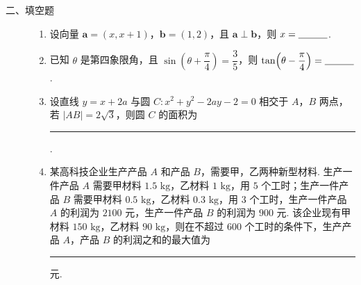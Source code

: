 \begin{description}

    \item[二、填空题]

    \begin{enumerate}[leftmargin=5pt]

      \addtocounter{enumi}{+12}

        \item 设向量 \(\bm{a}=(x,x+1)\)，\(\bm{b}=(1,2)\)，且 \(\bm{a}\perp\bm{b}\)，则 \(x=\rule[-0.3ex]{3em}{0.4pt}\).

        \item 已知 \(\theta\) 是第四象限角，且 \(\sin\!\left(\theta+\dfrac{\pi}{4}\right)=\dfrac35\)，则 \(\tan\!\left(\theta-\dfrac{\pi}{4}\right)=\rule[-0.3ex]{3em}{0.4pt}\).

        \item 设直线 \(y=x+2a\) 与圆 \(C:x^2+y^2-2ay-2=0\) 相交于 \(A\)，\(B\) 两点，若 \(|AB|=2\sqrt3\)，则圆 \(C\) 的面积为\rule[-0.3ex]{3em}{0.4pt}.

        \item 某高科技企业生产产品 \(A\) 和产品 \(B\)，需要甲，乙两种新型材料. 生产一件产品 \(A\) 需要甲材料 \(1.5\text{ kg}\)，乙材料 \(1\text{ kg}\)，用 \(5\) 个工时；生产一件产品 \(B\) 需要甲材料 \(0.5\text{ kg}\)，乙材料 \(0.3\text{ kg}\)，用 \(3\) 个工时，生产一件产品 \(A\) 的利润为 \(2100\) 元，生产一件产品 \(B\) 的利润为 \(900\) 元. 该企业现有甲材料 \(150\text{ kg}\)，乙材料 \(90\text{ kg}\)，则在不超过 \(600\) 个工时的条件下，生产产品 \(A\)，产品 \(B\) 的利润之和的最大值为\rule[-0.3ex]{3em}{0.4pt} 元.

    \end{enumerate}

\end{description}

